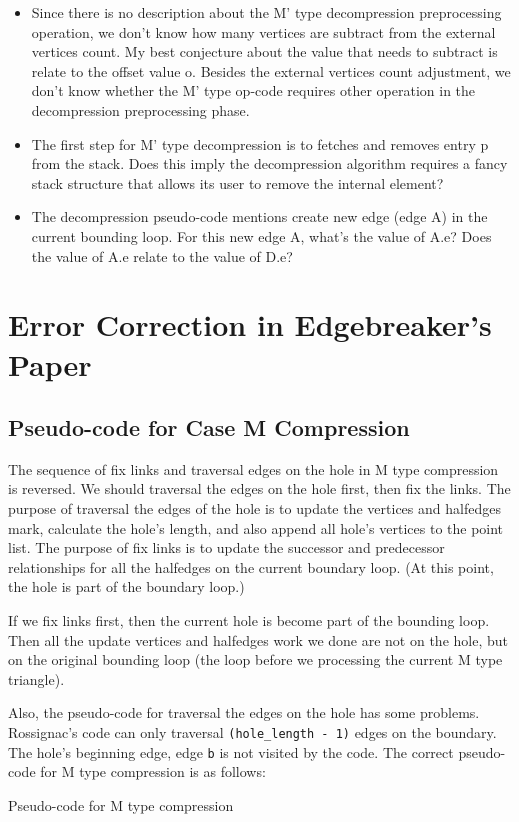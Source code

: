 \documentclass[onecolumn, 12pt]{article}
\begin{document}
{\begin{appendices}
\begin{itemize}
\item Since there is no description about the M' type decompression preprocessing operation, we don't know how many vertices are subtract from the external vertices count. My best conjecture about the value that needs to subtract is relate to the offset value o. Besides the external vertices count adjustment, we don't know whether the M' type op-code requires other operation in the decompression preprocessing phase.
\item The first step for M' type decompression is to fetches and removes entry p from the stack. Does this imply the decompression algorithm requires a fancy stack structure that allows its user to remove the internal element?
\item The decompression pseudo-code mentions create new edge (edge A) in the current bounding loop. For this new edge A, what's the value of A.e? Does the value of A.e relate to the value of D.e?
\end{itemize}


\section{Error Correction in Edgebreaker's Paper}
\subsection{Pseudo-code for Case M Compression}
The sequence of fix links and traversal edges on the hole in M type compression is reversed. We should traversal the edges on the hole first, then fix the links. The purpose of traversal the edges of the hole is to update the vertices and halfedges mark, calculate the hole's length, and also append all hole's vertices to the point list. The purpose of fix links is to update the successor and predecessor relationships for all the halfedges on the current boundary loop. (At this point, the hole is part of the boundary loop.)

If we fix links first, then the current hole is become part of the bounding loop. Then all the update vertices and halfedges work we done are not on the hole, but on the original bounding loop (the loop before we processing the current M type triangle).

Also, the pseudo-code for traversal the edges on the hole has some problems. Rossignac's code can only traversal \lstinline!(hole_length - 1)! edges on the boundary. The hole's beginning edge, edge \lstinline!b! is not visited by the code. The correct pseudo-code for M type compression is as follows:
\begin{algorithm}[H]
\caption{Pseudo-code for M type compression}
\begin{algorithmic}[1]
 
  
  
     
\ENDWHILE


\end{algorithmic}
\end{algorithm}
\end{appendices}}
\end{document}
